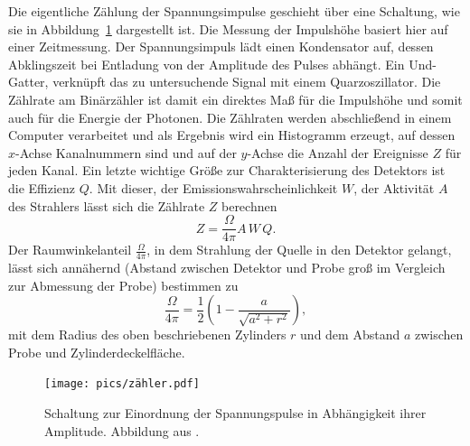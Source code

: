 Die eigentliche Zählung der Spannungsimpulse geschieht über eine Schaltung, wie sie in 
Abbildung~\ref{fig: zaehler}
dargestellt ist. Die Messung der Impulshöhe basiert hier auf einer Zeitmessung. Der Spannungsimpuls lädt einen 
Kondensator auf, dessen Abklingszeit bei Entladung von der Amplitude des Pulses abhängt. Ein Und-Gatter, verknüpft 
das zu untersuchende Signal mit einem Quarzoszillator. Die Zählrate am Binärzähler ist damit ein direktes Maß für 
die Impulshöhe und somit auch für die Energie der Photonen. 
Die Zählraten werden abschließend in einem Computer verarbeitet und als Ergebnis wird ein Histogramm erzeugt, auf dessen 
$x$-Achse Kanalnummern sind und auf der $y$-Achse die Anzahl der Ereignisse $Z$ für jeden Kanal. 
Ein letzte wichtige Größe zur Charakterisierung des Detektors ist 
die Effizienz $Q$. Mit dieser, der Emissionswahrscheinlichkeit $W$, der Aktivität $A$ des Strahlers lässt sich die 
Zählrate $Z$ berechnen 
\begin{equation}
    Z = \frac{\Omega}{4\pi} A \, W \, Q.
    \label{eq: zählrate}
\end{equation}
Der Raumwinkelanteil $\frac{\Omega}{4\pi}$, in dem Strahlung der Quelle in den Detektor gelangt, lässt sich annähernd (Abstand zwischen 
Detektor und Probe groß im Vergleich zur Abmessung der Probe) bestimmen zu 
\begin{equation}
    \frac{\Omega}{4\pi} = \frac{1}{2} \left( 1 - \frac{a}{\sqrt{a^2 + r^2}} \right),
    \label{eq: omega}
\end{equation}
mit dem Radius des oben beschriebenen Zylinders $r$ und dem Abstand $a$ zwischen Probe und Zylinderdeckelfläche. 
\begin{figure}
    \centering
    \texttt{[image: pics/zähler.pdf]}
    \caption{Schaltung zur Einordnung der Spannungspulse in Abhängigkeit ihrer Amplitude. Abbildung aus \cite{anleitungv18}.}
    \label{fig: zaehler}
\end{figure}

